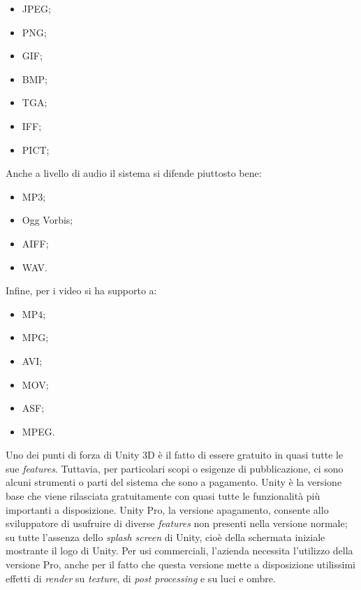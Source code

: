 \begin{multicols}{3}
	\begin{itemize}
	\item JPEG;
	\item PNG;
	\item GIF;
	\item BMP;
	\item TGA;
	\item IFF;
	\item PICT;
\end{itemize}
\end{multicols}

Anche a livello di audio il sistema si difende piuttosto bene: 
\begin{multicols}{2}
	\begin{itemize}
		\item MP3;
		\item Ogg Vorbis;
		\item AIFF;
		\item WAV.
	\end{itemize}
\end{multicols}

Infine, per i video si ha supporto a:
\begin{multicols}{3}
	\begin{itemize}
		\item MP4;
		\item MPG;
		\item AVI;
		\item MOV;
		\item ASF;
		\item MPEG.
	\end{itemize}
\end{multicols}

Uno dei punti di forza di Unity 3D \`e il fatto di essere gratuito in quasi tutte le sue \textit{features}. Tuttavia,
per particolari scopi o esigenze di pubblicazione, ci sono alcuni strumenti o parti del sistema che sono a pagamento. Unity \`e la versione base che viene rilasciata gratuitamente con quasi tutte le funzionalit\`a pi\`u importanti a disposizione. Unity Pro, la versione apagamento, consente allo sviluppatore di usufruire di diverse \textit{features} non presenti nella versione normale; su tutte l'assenza dello \textit{splash screen} di Unity, cio\`e della schermata iniziale mostrante il logo di Unity.
Per usi commerciali, l'azienda necessita l'utilizzo della versione Pro, anche per il fatto che questa versione mette a disposizione utilissimi effetti di \textit{render} su \textit{texture\gloss}, di \textit{post processing} e su luci e ombre.
\\


